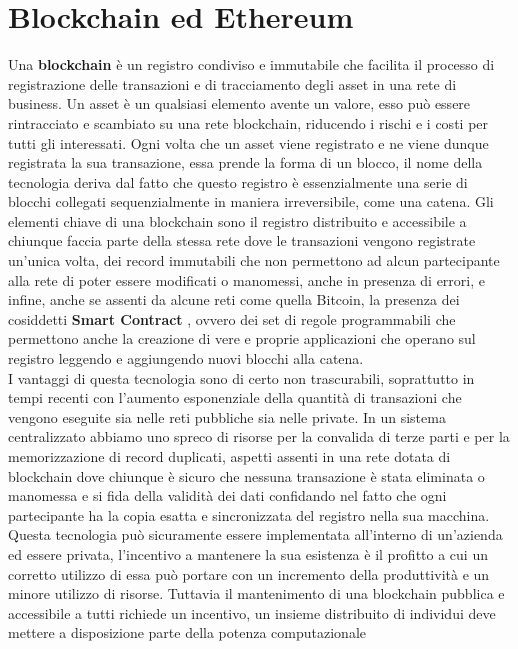 \section{Blockchain ed Ethereum}
\label{sub:bc}
Una \textbf{blockchain} è un registro condiviso e immutabile che facilita il processo di registrazione
delle transazioni e di tracciamento degli asset in una rete di business. Un asset è un qualsiasi
elemento avente un valore, esso può essere rintracciato e scambiato su una rete blockchain,
riducendo i rischi e i costi per tutti gli interessati. Ogni volta che un asset viene registrato e
ne viene dunque registrata la sua transazione, essa prende la forma di un blocco,
il nome della tecnologia deriva dal fatto che questo registro è essenzialmente una serie di blocchi
collegati sequenzialmente in maniera irreversibile, come una catena.
Gli elementi chiave di una blockchain sono il registro distribuito e accessibile a chiunque faccia
parte della stessa rete dove le transazioni vengono registrate un’unica volta, dei record immutabili
che non permettono ad alcun partecipante alla rete di poter essere modificati o manomessi,
anche in presenza di errori, e infine, anche se assenti da alcune reti come quella Bitcoin,
la presenza dei cosiddetti \textbf{Smart Contract} \label{sub:smp}, ovvero dei set di regole programmabili che permettono
anche la creazione di vere e proprie applicazioni che operano
sul registro leggendo e aggiungendo nuovi blocchi alla catena. \\
I vantaggi di questa tecnologia sono di certo non trascurabili, soprattutto in tempi
recenti con l’aumento esponenziale della quantità di transazioni che vengono eseguite
sia nelle reti pubbliche sia nelle private.
In un sistema centralizzato abbiamo uno spreco di risorse per la convalida di terze parti
e per la memorizzazione di record duplicati, aspetti assenti in una rete dotata di blockchain
dove chiunque è sicuro che nessuna transazione è stata eliminata o manomessa e si fida della
validità dei dati confidando nel fatto che ogni partecipante ha la copia esatta e sincronizzata
del registro nella sua macchina.
Questa tecnologia può sicuramente essere implementata all’interno di un’azienda ed essere privata,
l’incentivo a mantenere la sua esistenza è il profitto a cui un corretto utilizzo di essa può portare
con un incremento della produttività e un minore utilizzo di risorse.
Tuttavia il mantenimento di una blockchain pubblica e accessibile a tutti richiede un incentivo,
un insieme distribuito di individui deve mettere a disposizione parte della potenza computazionale

